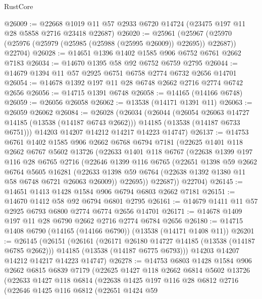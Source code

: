 \begin{lexlean}{RustCore}
\begin{coremodule}
@26009 := @22668 @1019 @11 @57 @2933 @6720 @14724 (@23475 @197 @11 @28 @5858 @2716 @23418 @22687)
@26020 := @25961
    (@25967 (@25970 (@25976 (@25979 (@25985 (@25988 (@25995 @26009)) @22695)) @22687)) @22704)
@26028 := @14651 @1396 @1402 @1585 @906 @6752 @6761 @2662 @7183
@26034 := @14670 @1395 @58 @92 @6752 @6759 @2795
@26044 := @14679 @1394 @11 @57 @2925 @6751 @6758 @2774 @6732 @2656 @14701
@26054 := @14678 @1392 @197 @11 @28 @6748 @2662 @2716 @2774 @6742 @2656
@26056 := @14715 @1391 @6748
@26058 := @14165 (@14166 @6748)
@26059 := @26056 @26058
@26062 := @13538 (@14171 @1391 @11)
@26063 := @26059 @26062
@26084 := @26028
    (@26034
      (@26044
        (@26054 @26063 @14727 @14185 (@13538 (@14187 @6743 @2662)))
        @14185
        (@13538 (@14187 @6733 @6751)))
      @14203
      @14207
      @14212
      @14217
      @14223
      @14747)
@26137 := @14753
    @6761
    @1402
    @1585
    @906
    @2662
    @6768
    @6794
    @7181
    (@22625
      @1401
      @118
      @2662
      @6767
      @5602
      @13726
      (@22633
        @1401
        @118
        @6767
        (@22638
          @1399
          @197
          @116
          @28
          @6765
          @2716
          (@22646
            @1399
            @116
            @6765
            (@22651
              @1398
              @59
              @2662
              @6764
              @5605
              @16281
              (@22633 @1398 @59 @6764 (@22638 @1392 @1380 @11 @58 @6748 @6721 @26063 @26009))
              @22695))
          @22687))
      @22704)
@26145 := @14651 @1413 @1428 @1584 @906 @6794 @6803 @2662 @7181
@26151 := @14670 @1412 @58 @92 @6794 @6801 @2795
@26161 := @14679 @1411 @11 @57 @2925 @6793 @6800 @2774 @6774 @2656 @14701
@26171 := @14678 @1409 @197 @11 @28 @6790 @2662 @2716 @2774 @6784 @2656
@26180 := @14715 @1408 @6790 (@14165 (@14166 @6790)) (@13538 (@14171 @1408 @11))
@26201 := @26145
    (@26151
      (@26161
        (@26171 @26180 @14727 @14185 (@13538 (@14187 @6785 @2662)))
        @14185
        (@13538 (@14187 @6775 @6793)))
      @14203
      @14207
      @14212
      @14217
      @14223
      @14747)
@26278 := @14753
    @6803
    @1428
    @1584
    @906
    @2662
    @6815
    @6839
    @7179
    (@22625
      @1427
      @118
      @2662
      @6814
      @5602
      @13726
      (@22633
        @1427
        @118
        @6814
        (@22638
          @1425
          @197
          @116
          @28
          @6812
          @2716
          (@22646
            @1425
            @116
            @6812
            (@22651
              @1424
              @59

\end{coremodule}
\end{lexlean}
